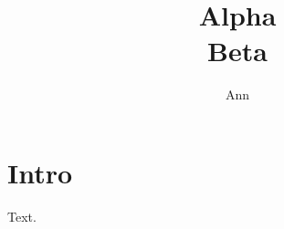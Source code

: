 \documentclass{article}
\title{Alpha\\Beta}\author{Ann}
\begin{document}
\begin{center}\usebox\lxbox\end{center}
\begin{center}\usebox\lxbox\end{center}
\maketitle
\section{Intro}
Text.
\end{document}
